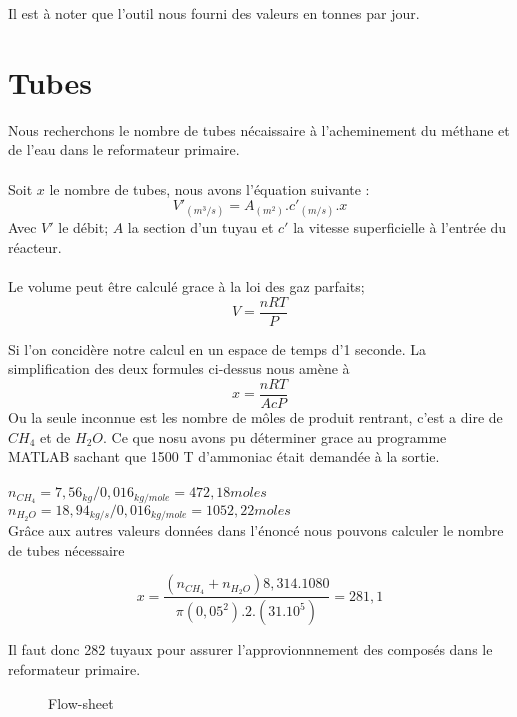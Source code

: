 \documentclass[a4paper, oneside, 12pt]{article}
\begin{document}
Il est à noter que l'outil nous fourni des valeurs en tonnes par jour.

\section*{Tubes}
Nous recherchons le nombre de tubes nécaissaire à l'acheminement du méthane et de l'eau dans le reformateur primaire.\\
\\
Soit $x$ le nombre de tubes, nous avons l'équation suivante :
\[
V'_{(m^3/s)} = A_{(m^2)}. c'_{(m/s)} .x
\]
Avec $V'$ le débit; $A$ la section d'un tuyau et $c'$ la vitesse superficielle à l'entrée du réacteur.\\
\\
Le volume peut être calculé grace à la loi des gaz parfaits;
\[
V=\frac{nRT}{P}
\]

Si l'on concidère notre calcul en un espace de temps d'1 seconde. La simplification des deux formules ci-dessus nous amène à
\[
x=\frac{nRT}{AcP}
\]
Ou la seule inconnue est les nombre de môles de produit rentrant, c'est a dire de $CH_{4}$ et de $H_{2}O$. Ce que nosu avons pu déterminer grace au programme MATLAB sachant que 1500 T d'ammoniac était demandée à la sortie.\\
\\
$n_{CH_{4}}= 7,56_{kg} / 0,016_{kg/mole} = 472,18 moles$\\
$n_{H_{2}O}= 18,94_{kg/s}/ 0,016_{kg/mole} = 1052,22 moles$\\

Grâce aux autres valeurs données dans l'énoncé nous pouvons calculer le nombre de tubes nécessaire 


\[
x=\frac{(n_{CH_{4}}+n_{H_{2}O})8,314.1080}{\pi(0,05^2).2.(31.10^5)}=281,1
\]

Il faut donc 282 tuyaux pour assurer l'approvionnnement des composés dans le reformateur primaire.

\begin{figure}
	
	\caption{Flow-sheet}
\end{figure}
\end{document}
